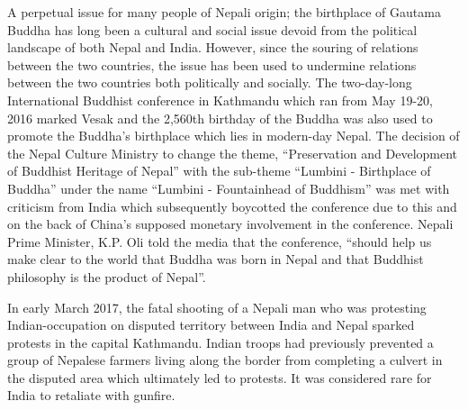 \documentclass[
  openany]{book}
\begin{document}
A perpetual issue for many people of Nepali origin; the birthplace of Gautama Buddha has long been a cultural and social issue devoid from the political landscape of both Nepal and India. However, since the souring of relations between the two countries, the issue has been used to undermine relations between the two countries both politically and socially. The two-day-long International Buddhist conference in Kathmandu which ran from May 19-20, 2016 marked Vesak and the 2,560th birthday of the Buddha was also used to promote the Buddha's birthplace which lies in modern-day Nepal. The decision of the Nepal Culture Ministry to change the theme, ``Preservation and Development of Buddhist Heritage of Nepal'' with the sub-theme ``Lumbini - Birthplace of Buddha'' under the name ``Lumbini - Fountainhead of Buddhism'' was met with criticism from India which subsequently boycotted the conference due to this and on the back of China's supposed monetary involvement in the conference. Nepali Prime Minister, K.P. Oli told the media that the conference, ``should help us make clear to the world that Buddha was born in Nepal and that Buddhist philosophy is the product of Nepal''.

In early March 2017, the fatal shooting of a Nepali man who was protesting Indian-occupation on disputed territory between India and Nepal sparked protests in the capital Kathmandu. Indian troops had previously prevented a group of Nepalese farmers living along the border from completing a culvert in the disputed area which ultimately led to protests. It was considered rare for India to retaliate with gunfire.
\end{document}
